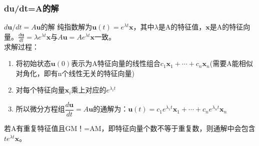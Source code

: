    \subsubsection{du/dt=A的解}
    $d \boldsymbol{u} / d t=A \boldsymbol{u}$的解
    纯指数解为$\boldsymbol{u}(t)=e^{\lambda t} \boldsymbol{x}$，其中$\lambda$是A的特征值，$\bm{x}$是A的特征向量。$\frac{d \boldsymbol{u}}{d t}=\lambda e^{\lambda t} \boldsymbol{x}$与$A \boldsymbol{u}=A e^{\lambda t} \boldsymbol{x}$一致。
    \\
    求解过程：
    \begin{enumerate}
        \item 将初始状态$\boldsymbol{u}(0)$表示为A特征向量的线性组合$c_{1} \boldsymbol{x}_{1}+\cdots+c_{n} \boldsymbol{x}_{n}$(需要A能相似对角化，即有n个线性无关的特征向量)
        \item 对每个特征向量$\boldsymbol{x}_{i}$乘上对应的$e^{\lambda_{i} t}$
        \item 所以微分方程组$\dfrac{d \bm{u}}{d t}=A \bm{u}$的通解为：$\bm{u}(t)=c_{1} e^{\lambda_{1} t} \bm{x}_{1}+\cdots+c_{n} e^{\lambda_{n} t} \bm{x}_{n}$
    \end{enumerate}
    若A有重复特征值且GM！=AM，即特征向量个数不等于重复数，则通解中会包含$t e^{\lambda t} \boldsymbol{x}$。

